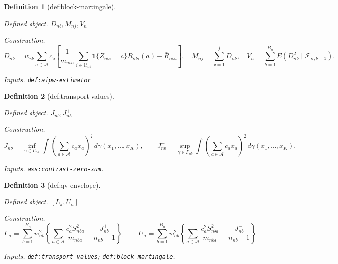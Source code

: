 \documentclass{article}
\newtheorem{definition}{Definition}
\begin{document}
\begin{definition}[def:block-martingale]\label{def:block-martingale}
\par\smallskip\noindent\emph{Defined object.} \(D_{nb},M_{nj},V_n\)
\par\smallskip\noindent\emph{Construction.} \[D_{nb}=w_{nb}\sum_{a\in\mathcal A}c_a\left[\frac1{m_{nba}}\sum_{i\in\mathcal U_{nb}}\mathbf 1\{Z_{nbi}=a\}R_{nbi}(a)-\bar R_{nba}\right],\quad M_{nj}=\sum_{b=1}^{j}D_{nb},\quad V_n=\sum_{b=1}^{B_n}E(D_{nb}^2\mid\mathcal F_{n,b-1}).\]
\par\smallskip\noindent\emph{Inputs.} \texttt{def:\allowbreak{}aipw-\allowbreak{}estimator}.
\end{definition}

\begin{definition}[def:transport-values]\label{def:transport-values}
\par\smallskip\noindent\emph{Defined object.} \(J_{nb}^{-},J_{nb}^{+}\)
\par\smallskip\noindent\emph{Construction.} \[J_{nb}^{-}=\inf_{\gamma\in\Gamma_{nb}}\int\left(\sum_{a\in\mathcal A}c_ax_a\right)^2\,d\gamma(x_1,\ldots,x_K),\qquad J_{nb}^{+}=\sup_{\gamma\in\Gamma_{nb}}\int\left(\sum_{a\in\mathcal A}c_ax_a\right)^2\,d\gamma(x_1,\ldots,x_K).\]
\par\smallskip\noindent\emph{Inputs.} \texttt{ass:\allowbreak{}contrast-\allowbreak{}zero-\allowbreak{}sum}.
\end{definition}

\begin{definition}[def:qv-envelope]\label{def:qv-envelope}
\par\smallskip\noindent\emph{Defined object.} \([L_n,U_n]\)
\par\smallskip\noindent\emph{Construction.} \[L_n=\sum_{b=1}^{B_n}w_{nb}^2\left\{\sum_{a\in\mathcal A}\frac{c_a^2S_{nba}^2}{m_{nba}}-\frac{J_{nb}^{+}}{n_{nb}-1}\right\},\qquad U_n=\sum_{b=1}^{B_n}w_{nb}^2\left\{\sum_{a\in\mathcal A}\frac{c_a^2S_{nba}^2}{m_{nba}}-\frac{J_{nb}^{-}}{n_{nb}-1}\right\}.\]
\par\smallskip\noindent\emph{Inputs.} \texttt{def:\allowbreak{}transport-\allowbreak{}values}; \texttt{def:\allowbreak{}block-\allowbreak{}martingale}.
\end{definition}
\end{document}
